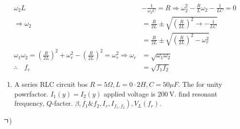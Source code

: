 \documentclass[12pt, a4paper]{article}
\begin{document}
	$$
		\begin{aligned}
			\omega_{2} L                                                                                                                             & -\frac{1}{\omega_{2} C}=R \Rightarrow \omega_{2}^{2}-\frac{R}{L} \omega_{2}-\frac{1}{L C}=0 \\
			\Rightarrow \omega_{2}                                                                                                                   & =\frac{R}{2 L} \pm \sqrt{\left(\frac{R}{2 L}\right)^{2} \rightarrow-\frac{1}{L C}}          \\
			                                                                                                                                         & =\frac{R}{2 L} \pm \sqrt{\left(\frac{R}{2 L}\right)^{2}-\omega_{r}^{2}}                     \\
			\omega_{1} \omega_{2}=\left(\frac{R}{2 L}\right)^{2}+\omega_{r}^{2}-\left(\frac{R}{2 L}\right)^{2}=\omega_{r}^{2} \Rightarrow \omega_{r} & =\sqrt{\omega_{1} \omega_{2}}                                                               \\
			\therefore \quad f_{r}                                                                                                                   & =\sqrt{f_{1} f_{2}}
		\end{aligned}
	$$

	\begin{enumerate}
		\item A series RLC circuit bos $R=5 \Omega, L=0 \cdot 2 H, C=50 \mu F$. The for unity powrfactor. $I_{1}(y)=I_{2}(y)$ applied voltage is $200 \mathrm{~V}$. find resonant frequency, $Q$-facter. $\left.\beta, f_{1} \& f_{2}, I_{r}, I_{f_{1}, f_{2}}\right), V_{L}\left(f_{r}\right)$.
	\end{enumerate}

	ㄱ)
\end{document}
